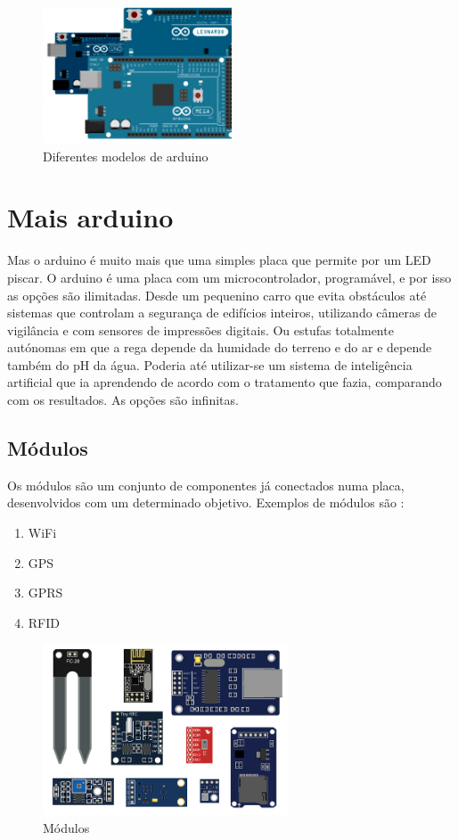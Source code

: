 \documentclass{article}
\begin{document}
\begin{figure}[h]
\centering
\includegraphics[width=0.5\textwidth]{img/arduino}
\caption{Diferentes modelos de arduino}
\end{figure}

\section{Mais arduino}
Mas o arduino é muito mais que uma simples placa que permite por um LED  piscar. O arduino é uma placa com um microcontrolador, programável, e por isso as opções são ilimitadas. Desde um pequenino carro que evita obstáculos até sistemas que controlam a segurança de edifícios inteiros, utilizando câmeras de vigilância e com sensores de impressões digitais. Ou estufas totalmente autónomas em que a rega depende da humidade do terreno e do ar e depende também do pH da água. Poderia até utilizar-se um sistema de inteligência artificial que ia aprendendo de acordo com o tratamento que fazia, comparando com os resultados. As opções são infinitas.

\subsection{Módulos}
Os módulos são um conjunto de componentes já conectados numa placa, desenvolvidos com um determinado objetivo. Exemplos de módulos são :
\begin{enumerate}
\item WiFi
\item GPS
\item GPRS
\item RFID
\end{enumerate}

\begin{figure}[h]
\centering
\includegraphics[width=0.65\textwidth]{img/shields}
\caption{Módulos}
\end{figure}
\end{document}
